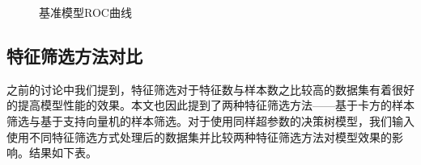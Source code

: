 \begin{figure}[!ht]
\centering
{}
\caption{基准模型ROC曲线}
\end{figure}



\subsection{特征筛选方法对比}
之前的讨论中我们提到，特征筛选对于特征数与样本数之比较高的数据集有着很好的提高模型性能的效果。本文也因此提到了两种特征筛选方法——基于卡方的样本筛选与基于支持向量机的样本筛选。对于使用同样超参数的决策树模型，我们输入使用不同特征筛选方式处理后的数据集并比较两种特征筛选方法对模型效果的影响。结果如下表。

